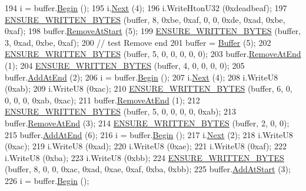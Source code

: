 \begin{DoxyCode}
194   i = buffer.\hyperlink{classns3_1_1Buffer_a893d4bf50df13e730b6cd0fda91b967f}{Begin} ();
195   i.\hyperlink{classns3_1_1Buffer_1_1Iterator_a5eaa564bdc98d063b7e94b1768aeed6b}{Next} (4);
196   i.WriteHtonU32 (0xdeadbeaf);
197   \hyperlink{buffer-test_8cc_adb8db1b0f6eec9da1f9f6d8b9f1e4ba8}{ENSURE\_WRITTEN\_BYTES} (buffer, 8,  0xbe, 0xaf, 0, 0, 0xde, 0xad, 0xbe, 0xaf);
198   buffer.\hyperlink{classns3_1_1Buffer_adeecbb3e8f518aec6fee0437578ade4b}{RemoveAtStart} (5);
199   \hyperlink{buffer-test_8cc_adb8db1b0f6eec9da1f9f6d8b9f1e4ba8}{ENSURE\_WRITTEN\_BYTES} (buffer, 3,  0xad, 0xbe, 0xaf);
200   \textcolor{comment}{// test Remove end}
201   buffer = \hyperlink{classns3_1_1Buffer}{Buffer} (5);
202   \hyperlink{buffer-test_8cc_adb8db1b0f6eec9da1f9f6d8b9f1e4ba8}{ENSURE\_WRITTEN\_BYTES} (buffer, 5, 0, 0, 0, 0, 0);
203   buffer.\hyperlink{classns3_1_1Buffer_a83b30fd8e1202e778fb471757b800d47}{RemoveAtEnd} (1);
204   \hyperlink{buffer-test_8cc_adb8db1b0f6eec9da1f9f6d8b9f1e4ba8}{ENSURE\_WRITTEN\_BYTES} (buffer, 4, 0, 0, 0, 0);
205   buffer.\hyperlink{classns3_1_1Buffer_a92dd87809af24fb10696fee9a9cb56cf}{AddAtEnd} (2);
206   i = buffer.\hyperlink{classns3_1_1Buffer_a893d4bf50df13e730b6cd0fda91b967f}{Begin} ();
207   i.\hyperlink{classns3_1_1Buffer_1_1Iterator_a5eaa564bdc98d063b7e94b1768aeed6b}{Next} (4);
208   i.WriteU8 (0xab);
209   i.WriteU8 (0xac);
210   \hyperlink{buffer-test_8cc_adb8db1b0f6eec9da1f9f6d8b9f1e4ba8}{ENSURE\_WRITTEN\_BYTES} (buffer, 6, 0, 0, 0, 0, 0xab, 0xac);
211   buffer.\hyperlink{classns3_1_1Buffer_a83b30fd8e1202e778fb471757b800d47}{RemoveAtEnd} (1);
212   \hyperlink{buffer-test_8cc_adb8db1b0f6eec9da1f9f6d8b9f1e4ba8}{ENSURE\_WRITTEN\_BYTES} (buffer, 5, 0, 0, 0, 0, 0xab);
213   buffer.\hyperlink{classns3_1_1Buffer_a83b30fd8e1202e778fb471757b800d47}{RemoveAtEnd} (3);
214   \hyperlink{buffer-test_8cc_adb8db1b0f6eec9da1f9f6d8b9f1e4ba8}{ENSURE\_WRITTEN\_BYTES} (buffer, 2, 0, 0);
215   buffer.\hyperlink{classns3_1_1Buffer_a92dd87809af24fb10696fee9a9cb56cf}{AddAtEnd} (6);
216   i = buffer.\hyperlink{classns3_1_1Buffer_a893d4bf50df13e730b6cd0fda91b967f}{Begin} ();
217   i.\hyperlink{classns3_1_1Buffer_1_1Iterator_a5eaa564bdc98d063b7e94b1768aeed6b}{Next} (2);
218   i.WriteU8 (0xac);
219   i.WriteU8 (0xad);
220   i.WriteU8 (0xae);
221   i.WriteU8 (0xaf);
222   i.WriteU8 (0xba);
223   i.WriteU8 (0xbb);
224   \hyperlink{buffer-test_8cc_adb8db1b0f6eec9da1f9f6d8b9f1e4ba8}{ENSURE\_WRITTEN\_BYTES} (buffer, 8, 0, 0, 0xac, 0xad, 0xae, 0xaf, 0xba, 0xbb);
225   buffer.\hyperlink{classns3_1_1Buffer_a8abd8164c3671d3dadc98fc66fade7b1}{AddAtStart} (3);
226   i = buffer.\hyperlink{classns3_1_1Buffer_a893d4bf50df13e730b6cd0fda91b967f}{Begin} ();

\end{DoxyCode}
